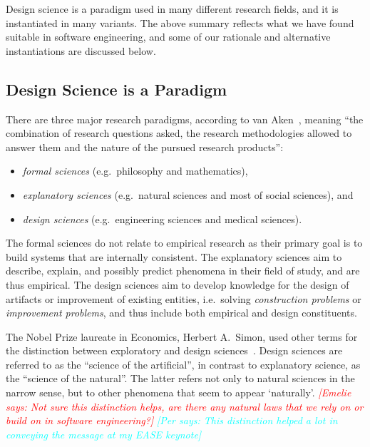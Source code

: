 \documentclass[graybox]{svmult}
\newcommand{\emelie}[1]{\textcolor{red}{{\it [Emelie says: #1]}}}
\newcommand{\per}[1]{\textcolor{cyan}{{\it [Per says: #1]}}}
\newcommand{\emelie}[1]{}
\newcommand{\per}[1]{}
\begin{document}

Design science is a paradigm used in many different research fields, and it is instantiated in many variants.  The above summary reflects what we have found suitable in software engineering, and some of our rationale and alternative instantiations are discussed below.


\subsection{Design Science is a Paradigm}
There are three major research paradigms, according to van Aken~\cite{van_aken_management_2004}, meaning ``the combination of research questions asked, the research methodologies allowed to answer them and the nature of the pursued research products'':
\begin{itemize}
\item \emph{formal sciences} (e.g.\ philosophy and mathematics), 
\item \emph{explanatory sciences} (e.g.\ natural sciences and most of social sciences), and 
\item \emph{design sciences} (e.g.\ engineering sciences and medical sciences).  
\end{itemize}
The formal sciences do not relate to empirical research as their primary goal is to build systems that are internally consistent. The explanatory sciences aim to describe, explain, and possibly predict phenomena in their field of study, and are thus empirical. The design sciences aim to develop knowledge for the design of artifacts or improvement of existing entities, i.e.\ solving \emph{construction problems} or  \emph{improvement problems}, and thus include both empirical and design constituents. 

The Nobel Prize laureate in Economics, Herbert A.\ Simon, used other terms for the distinction between exploratory and design sciences~\cite{Simons69}. Design sciences are referred to as the ``science of the artificial'', in contrast to explanatory science, as the ``science of the natural''. The latter refers not only to natural sciences in the narrow sense, but to other phenomena that seem to appear `naturally'. %
\emelie{Not sure this distinction helps, are there any natural laws that we rely on or build on in software engineering?} \per{This distinction helped a lot in conveying the message at my EASE keynote}
\end{document}
